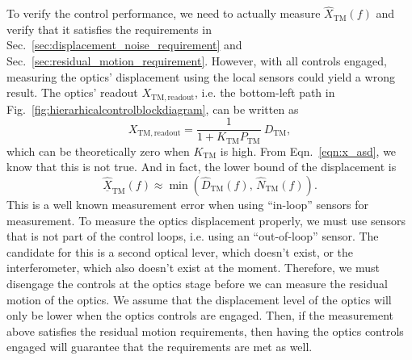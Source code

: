 To verify the control performance, we need to actually measure $\hat{X}_\mathrm{TM}(f)$ and verify that it satisfies the requirements in Sec.~\ref{sec:displacement_noise_requirement} and Sec.~\ref{sec:residual_motion_requirement}.
However, with all controls engaged, measuring the optics' displacement using the local sensors could yield a wrong result.
The optics' readout $X_\mathrm{TM, readout}$, i.e. the bottom-left path in Fig.~\ref{fig:hierarhicalcontrolblockdiagram}, can be written as
\begin{equation}
	X_\mathrm{TM, readout} = \frac{1}{1+K_\mathrm{TM}P_\mathrm{TM}}\ D_\mathrm{TM},
\end{equation}
which can be theoretically zero when $K_\mathrm{TM}$ is high.
From Eqn.~\eqref{eqn:x_asd}, we know that this is not true.
And in fact, the lower bound of the displacement is
\begin{equation}
	\underline{\hat{X}}_\mathrm{TM}(f)\approx\min\left(\hat{D}_\mathrm{TM}(f),\, \hat{N}_\mathrm{TM}(f)\right).
\end{equation}
This is a well known measurement error when using ``in-loop'' sensors for measurement.
To measure the optics displacement properly, we must use sensors that is not part of the control loops, i.e. using an ``out-of-loop'' sensor.
The candidate for this is a second optical lever, which doesn't exist, or the interferometer, which also doesn't exist at the moment.
Therefore, we must disengage the controls at the optics stage before we can measure the residual motion of the optics.
We assume that the displacement level of the optics will only be lower when the optics controls are engaged.
Then, if the measurement above satisfies the residual motion requirements, then having the optics controls engaged will guarantee that the requirements are met as well.

